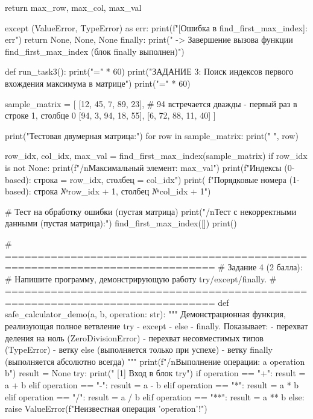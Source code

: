 \documentclass[14pt,a4paper]{extarticle}
\begin{document}
\begin{CodeListing}
        return max_row, max_col, max_val

    except (ValueError, TypeError) as err:
        print(f"[Ошибка в find_first_max_index]: {err}")
        return None, None, None
    finally:
        print("  -> Завершение вызова функции find_first_max_index (блок finally выполнен)")


def run_task3():
    print("=" * 60)
    print("ЗАДАНИЕ 3: Поиск индексов первого вхождения максимума в матрице")
    print("=" * 60)

    sample_matrix = [
        [12, 45, 7, 89, 23],
        # 94 встречается дважды - первый раз в строке 1, столбце 0
        [94, 3, 94, 18, 55],
        [6, 72, 88, 11, 40]
    ]

    print("Тестовая двумерная матрица:")
    for row in sample_matrix:
        print("  ", row)

    row_idx, col_idx, max_val = find_first_max_index(sample_matrix)
    if row_idx is not None:
        print(f"/nМаксимальный элемент: {max_val}")
        print(f"Индексы (0-based): строка = {row_idx}, столбец = {col_idx}")
        print(
            f"Порядковые номера (1-based): строка №{row_idx + 1}, столбец №{col_idx + 1}")

    # Тест на обработку ошибки (пустая матрица)
    print("/nТест с некорректными данными (пустая матрица):")
    find_first_max_index([])
    print()


# ==============================================================================
# Задание 4 (2 балла):
# Напишите программу, демонстрирующую работу try/except/finally.
# ==============================================================================
def safe_calculator_demo(a, b, operation: str):
    """
    Демонстрационная функция, реализующая полное ветвление try - except - else - finally.
    Показывает:
    - перехват деления на ноль (ZeroDivisionError)
    - перехват несовместимых типов (TypeError)
    - ветку else (выполняется только при успехе)
    - ветку finally (выполняется абсолютно всегда)
    """
    print(f"/nВыполнение операции: {a} {operation} {b}")
    result = None
    try:
        print("  [1] Вход в блок try")
        if operation == "+":
            result = a + b
        elif operation == "-":
            result = a - b
        elif operation == "*":
            result = a * b
        elif operation == "/":
            result = a / b
        elif operation == "**":
            result = a ** b
        else:
            raise ValueError(f"Неизвестная операция '{operation}'!")


\end{CodeListing}
\end{document}

